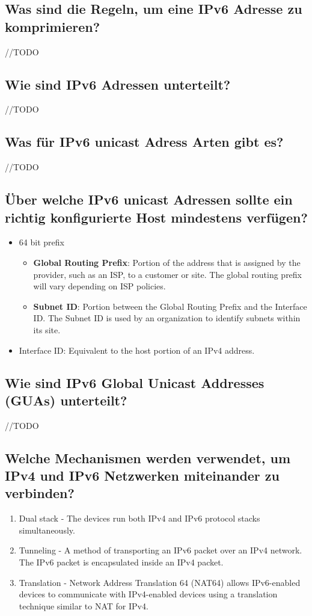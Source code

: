 \subsection*{Was sind die Regeln, um eine IPv6 Adresse zu komprimieren?}
//TODO
\subsection*{Wie sind IPv6 Adressen unterteilt?}
//TODO
\subsection*{Was für IPv6 unicast Adress Arten gibt es?}
//TODO
\subsection*{Über welche IPv6 unicast Adressen sollte ein richtig konfigurierte Host mindestens verfügen?}
\begin{itemize}
    \item 64 bit prefix
    \begin{itemize}
        \item \textbf{Global Routing Prefix}: Portion of the address that is assigned by the provider, such as an ISP, to a customer or site. The global routing prefix will vary depending on ISP policies.
        \item \textbf{Subnet ID}: Portion between the Global Routing Prefix and the Interface ID. The Subnet ID is used by an organization to identify subnets within its site.
    \end{itemize}
    \item Interface ID: Equivalent to the host portion of an IPv4 address.
\end{itemize}
\subsection*{Wie sind IPv6 Global Unicast Addresses (GUAs) unterteilt?}
//TODO
\subsection*{Welche Mechanismen werden verwendet, um IPv4 und IPv6 Netzwerken miteinander zu verbinden?}
\begin{enumerate}
    \item Dual stack - The devices run both IPv4 and IPv6 protocol stacks simultaneously.
    \item Tunneling - A method of transporting an IPv6 packet over an IPv4 network. The IPv6 packet is encapsulated inside an IPv4 packet.
    \item Translation - Network Address Translation 64 (NAT64) allows IPv6-enabled devices to communicate with IPv4-enabled devices using a translation technique similar to NAT for IPv4.
\end{enumerate}